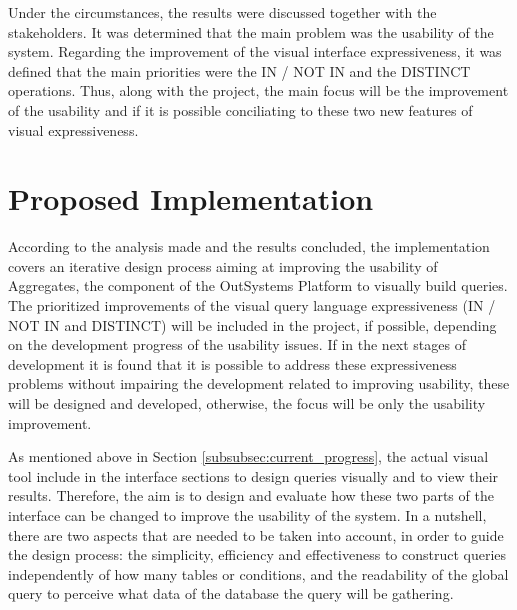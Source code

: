 Under the circumstances, the results were discussed together with the stakeholders. It was determined that the main problem was the usability of the system. Regarding the improvement of the visual interface expressiveness, it was defined that the main priorities were the IN / NOT IN and the DISTINCT operations. Thus, along with the project, the main focus will be the improvement of the usability and if it is possible conciliating to these two new features of visual expressiveness.

\section{Proposed Implementation}
\label{sec:proposed_implementation}
According to the analysis made and the results concluded, the implementation covers an iterative design process aiming at improving the usability of Aggregates, the component of the OutSystems Platform to visually build queries. The prioritized improvements of the visual query language expressiveness (IN / NOT IN and DISTINCT) will be included in the project, if possible, depending on the development progress of the usability issues. If in the next stages of development it is found that it is possible to address these expressiveness problems without impairing the development related to improving usability, these will be designed and developed, otherwise, the focus will be only the usability improvement. %

As mentioned above in Section \ref{subsubsec:current_progress}, the actual visual tool include in the interface sections to design queries visually and to view their results. Therefore, the aim is to design and evaluate how these two parts of the interface can be changed to improve the usability of the system. In a nutshell, there are two aspects that are needed to be taken into account, in order to guide the design process: the simplicity, efficiency and effectiveness to construct queries independently of how many tables or conditions, and the readability of the global query to perceive what data of the database the query will be gathering.


